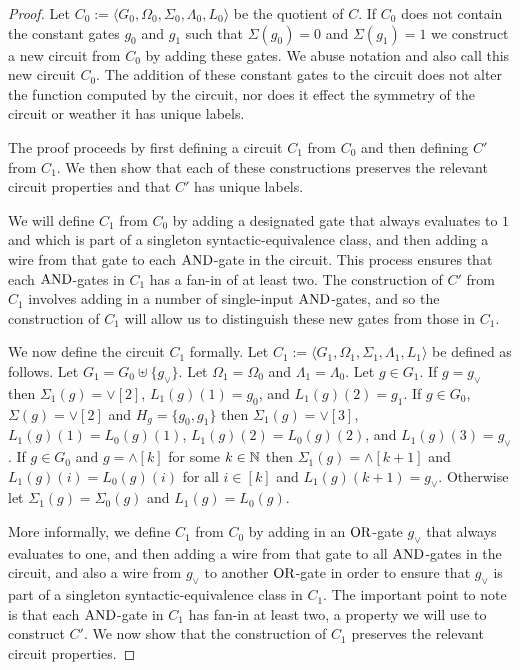 \documentclass[../paper.tex]{subfiles}
\begin{document}
\begin{proof}
  Let $C_0 := \langle G_0, \Omega_0, \Sigma_0, \Lambda_0, L_0 \rangle$ be the
  quotient of $C$. If $C_0$ does not contain the constant gates $g_0$ and $g_1$
  such that $\Sigma(g_0) = 0$ and $\Sigma (g_1) = 1$ we construct a new circuit
  from $C_0$ by adding these gates. We abuse notation and also call this new
  circuit $C_0$. The addition of these constant gates to the circuit does not
  alter the function computed by the circuit, nor does it effect the symmetry of
  the circuit or weather it has unique labels.

  The proof proceeds by first defining a circuit $C_1$ from $C_0$ and then
  defining $C'$ from $C_1$. We then show that each of these constructions
  preserves the relevant circuit properties and that $C'$ has unique labels.

  We will define $C_1$ from $C_0$ by adding a designated gate that always
  evaluates to $1$ and which is part of a singleton syntactic-equivalence class,
  and then adding a wire from that gate to each $\text{\upshape AND}$-gate in the circuit. This
  process ensures that each $\text{\upshape AND}$-gates in $C_1$ has a fan-in of at least two.
  The construction of $C'$ from $C_1$ involves adding in a number of
  single-input $\text{\upshape AND}$-gates, and so the construction of $C_1$ will allow us to
  distinguish these new gates from those in $C_1$.

  We now define the circuit $C_1$ formally. Let $C_1 := \langle G_1, \Omega_1,
  \Sigma_1 , \Lambda_1, L_1 \rangle$ be defined as follows. Let $G_1 = G_0
  \uplus \{ g_\lor\}$. Let $\Omega_1 = \Omega_0$ and $\Lambda_1 = \Lambda_0$.
  Let $g \in G_1$. If $g = g_\lor$ then $\Sigma_1 (g) = \lor[2]$, $L_1(g)(1) =
  g_0$, and $L_1(g)(2) = g_1$. If $g \in G_0$, $\Sigma(g) = \lor[2]$ and $H_g =
  \{g_0, g_1\}$ then $\Sigma_1 (g) = \lor[3]$, $L_1(g)(1) = L_0(g)(1)$,
  $L_1(g)(2) = L_0(g)(2)$, and $L_1(g)(3) = g_\lor$. If $g \in G_0$ and $g =
  \land[k]$ for some $k \in \mathbb{N}$ then $\Sigma_1(g) = \land[k+1]$ and
  $L_1(g)(i) = L_0(g)(i)$ for all $i \in [k]$ and $L_1(g)(k+1) = g_\lor$.
  Otherwise let $\Sigma_1(g) = \Sigma_0(g)$ and $L_1(g) = L_0(g)$.

  More informally, we define $C_1$ from $C_0$ by adding in an $\text{\upshape OR}$-gate
  $g_\lor$ that always evaluates to one, and then adding a wire from that gate
  to all $\text{\upshape AND}$-gates in the circuit, and also a wire from $g_\lor$ to another
  $\text{\upshape OR}$-gate in order to ensure that $g_\lor$ is part of a singleton
  syntactic-equivalence class in $C_1$. The important point to note is that each
  $\text{\upshape AND}$-gate in $C_1$ has fan-in at least two, a property we will use to
  construct $C'$. We now show that the construction of $C_1$ preserves the
  relevant circuit properties.
  

\end{proof}
\end{document}
